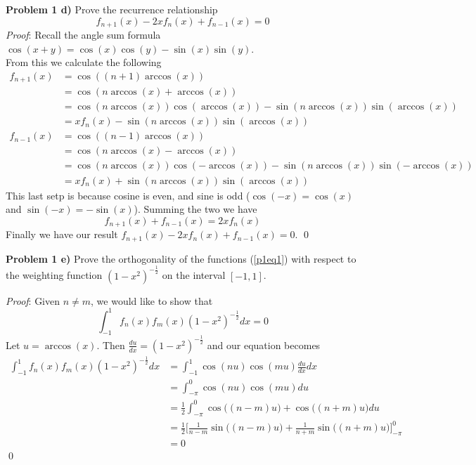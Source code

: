 \documentclass[12pt]{article}
\newcommand{\problem}[1]{\hspace{-4 ex} \large \textbf{Problem #1} }
\renewenvironment{proof}{\hspace{-4 ex} \emph{Proof}:}{\qed}
\begin{document}
\problem{1 d)} Prove the recurrence relationship 
	$$
	f_{n+1}(x) - 2xf_n(x) + f_{n-1}(x) = 0
	$$
	\begin{proof}
		Recall the angle sum formula $\cos(x+y) = \cos(x)\cos(y) - \sin(x)\sin(y)$. \\
		From this we calculate the following
		\begin{align*}
			f_{n+1}(x) & = \cos((n+1)\arccos(x)) \\
			& = \cos(n \arccos(x) + \arccos(x)) \\
			& = \cos(n\arccos(x))\cos(\arccos(x)) - \sin(n \arccos(x))\sin(\arccos(x))\\
			& = xf_n(x) - \sin(n \arccos(x))\sin(\arccos(x)) \\
			f_{n-1}(x) & = \cos((n-1)\arccos(x)) \\
			& = \cos(n \arccos(x) - \arccos(x)) \\
			& = \cos(n\arccos(x))\cos(-\arccos(x)) - \sin(n \arccos(x))\sin(-\arccos(x))\\
			& = xf_n(x) + \sin(n \arccos(x))\sin(\arccos(x))
		\end{align*}
		This last setp is because cosine is even, and sine is odd ($\cos(-x) = \cos(x)$ and $\sin(-x) = -\sin(x)$).
		Summing the two we have
		$$
		f_{n+1}(x) + f_{n-1}(x) = 2xf_n(x)
		$$
		Finally we have our result $f_{n+1}(x) - 2xf_n(x) + f_{n-1}(x) = 0$.
	\end{proof}

\problem{1 e)} Prove the orthogonality of the functions (\ref{p1eq1}) with respect to the weighting function $(1-x^2)^{-\tfrac{1}{2}}$ on the interval $[-1,1]$.

	\begin{proof}
		Given $ n \neq m$, we would like to show that 
		$$
		\int_{-1}^{1} f_n(x)f_m(x)(1-x^2)^{-\tfrac{1}{2}} dx = 0
		$$
		Let $u = \arccos(x)$. Then $\tfrac{du}{dx} = (1-x^2)^{-\tfrac{1}{2}}$ and our equation becomes
		\begin{align*}
			\int_{-1}^{1} f_n(x)f_m(x)(1-x^2)^{-\tfrac{1}{2}} dx & = \int_{-1}^{1} \cos(nu)\cos(mu) \tfrac{du}{dx} dx \\
			& = \int_{-\pi}^{0} \cos(nu)\cos(mu) du \\
			& = \tfrac{1}{2}\int_{-\pi}^{0} \cos\Big((n-m)u \Big) + \cos\Big((n+m)u \Big) du \\
			& = \tfrac{1}{2} \Big[ \tfrac{1}{n-m}\sin\Big((n-m)u \Big) + \tfrac{1}{n+m}\sin\Big((n+m)u \Big) \Big]_{-\pi}^{0} \\
			& = 0
		\end{align*}
	\end{proof}
	
\end{document}
